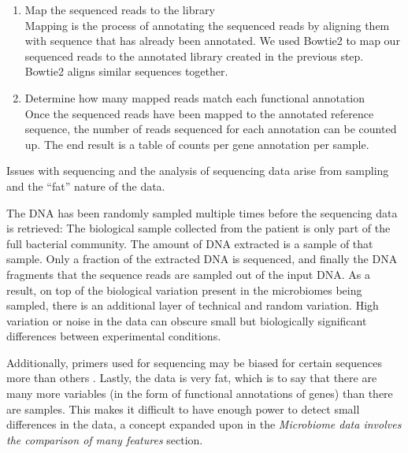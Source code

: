 \begin{enumerate}
\item Map the sequenced reads to the library\\
Mapping is the process of annotating the sequenced reads by aligning them with sequence that has already been annotated. We used Bowtie2 \cite{langmead2012fast} to map our sequenced reads to the annotated library created in the previous step. Bowtie2 aligns similar sequences together.

\item Determine how many mapped reads match each functional annotation\\
Once the sequenced reads have been mapped to the annotated reference sequence, the number of reads sequenced for each annotation can be counted up. The end result is a table of counts per gene annotation per sample.
\end{enumerate}

Issues with sequencing and the analysis of sequencing data arise from sampling and the ``fat'' nature of the data.

The DNA has been randomly sampled multiple times before the sequencing data is retrieved: The biological sample collected from the patient is only part of the full bacterial community. The amount of DNA extracted is a sample of that sample. Only a fraction of the extracted DNA is sequenced, and finally the DNA fragments that the sequence reads are sampled out of the input DNA. As a result, on top of the biological variation present in the microbiomes being sampled, there is an additional layer of technical and random variation. High variation or noise in the data can obscure small but biologically significant differences between experimental conditions.

Additionally, primers used for sequencing may be biased for certain sequences more than others \cite{kanagawa2003bias}. Lastly, the data is very fat, which is to say that there are many more variables (in the form of functional annotations of genes) than there are samples. This makes it difficult to have enough power to detect small differences in the data, a concept expanded upon in the \textit{Microbiome data involves the comparison of many features} section.

\FloatBarrier

